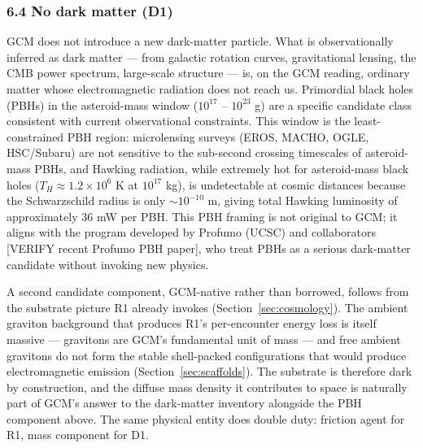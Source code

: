 \documentclass[12pt]{article}
\theoremstyle{definition}
\theoremstyle{remark}
\begin{document}
\subsubsection{6.4 No dark matter (D1)}\label{no-dark-matter-d1}

GCM does not introduce a new dark-matter particle. What is
observationally inferred as dark matter --- from galactic rotation
curves, gravitational lensing, the CMB power spectrum, large-scale
structure --- is, on the GCM reading, ordinary matter whose
electromagnetic radiation does not reach us. Primordial black holes
(PBHs) in the asteroid-mass window (\(10^{17}\) -- \(10^{23}\) g) are a
specific candidate class consistent with current observational
constraints. This window is the least-constrained PBH region:
microlensing surveys (EROS, MACHO, OGLE, HSC/Subaru) are not sensitive
to the sub-second crossing timescales of asteroid-mass PBHs, and Hawking
radiation, while extremely hot for asteroid-mass black holes
(\(T_H \approx 1.2 \times 10^6\) K at \(10^{17}\) kg), is undetectable
at cosmic distances because the Schwarzschild radius is only
\(\sim 10^{-10}\) m, giving total Hawking luminosity of approximately 36
mW per PBH. This PBH framing is not original to GCM; it aligns with the
program developed by Profumo (UCSC) and collaborators {[}VERIFY recent
Profumo PBH paper{]}, who treat PBHs as a serious dark-matter candidate
without invoking new physics.

A second candidate component, GCM-native rather than borrowed, follows
from the substrate picture R1 already invokes
(Section~\ref{sec:cosmology}). The ambient graviton background that
produces R1's per-encounter energy loss is itself massive --- gravitons
are GCM's fundamental unit of mass --- and free ambient gravitons do not
form the stable shell-packed configurations that would produce
electromagnetic emission (Section~\ref{sec:scaffolds}). The substrate is
therefore dark by construction, and the diffuse mass density it
contributes to space is naturally part of GCM's answer to the
dark-matter inventory alongside the PBH component above. The same
physical entity does double duty: friction agent for R1, mass component
for D1.
\end{document}
